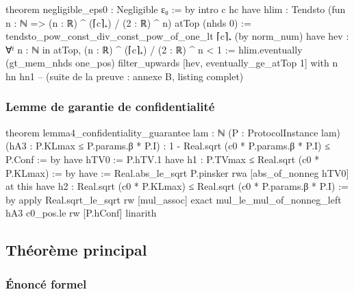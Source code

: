 \begin{sloppypar}
\begin{leancode}[caption={Preuve de n\'egligeabilit\'e en Lean4}, label={lst:lean4_eps0}]
theorem negligible_eps0 : Negligible ε₀ := by
  intro c hc
  have hlim : Tendsto (fun n : ℕ => (n : ℝ) ^ (⌈c⌉₊) / (2 : ℝ) ^ n) atTop (nhds 0) :=
    tendsto_pow_const_div_const_pow_of_one_lt ⌈c⌉₊ (by norm_num)
  have hev : ∀ᶠ n : ℕ in atTop, (n : ℝ) ^ (⌈c⌉₊) / (2 : ℝ) ^ n < 1 :=
    hlim.eventually (gt_mem_nhds one_pos)
  filter_upwards [hev, eventually_ge_atTop 1] with n hn hn1
  -- (suite de la preuve : annexe B, listing complet)
\end{leancode}

\subsubsection{Lemme de garantie de confidentialit\'e}
\label{subsubsec:lemme4_lean4}

\begin{leancode}[caption={Lemme de garantie de confidentialit\'e en Lean4}, label={lst:lean4_lemma4}]
theorem lemma4_confidentiality_guarantee {lam : ℕ} (P : ProtocolInstance lam)
    (hA3 : P.KLmax ≤ P.params.β * P.I) :
    1 - Real.sqrt (c0 * P.params.β * P.I) ≤ P.Conf := by
  have hTV0 := P.hTV.1
  have h1 : P.TVmax ≤ Real.sqrt (c0 * P.KLmax) := by
    have := Real.abs_le_sqrt P.pinsker
    rwa [abs_of_nonneg hTV0] at this
  have h2 : Real.sqrt (c0 * P.KLmax) ≤ Real.sqrt (c0 * P.params.β * P.I) := by
    apply Real.sqrt_le_sqrt
    rw [mul_assoc]
    exact mul_le_mul_of_nonneg_left hA3 c0_pos.le
  rw [P.hConf]
  linarith
\end{leancode}
\end{sloppypar}

\subsection{Th\'eor\`eme principal}
\label{subsec:theoreme_principal_lean4}

\subsubsection{\'Enonc\'e formel}
\label{subsubsec:enonce_formel_lean4}

